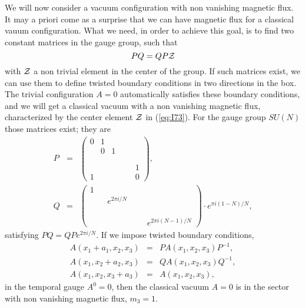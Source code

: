 We will now consider a vacuum configuration with non vanishing
magnetic flux. It may a priori come as a surprise that we can
have magnetic flux for a classical vauum configuration. What we
need, in order to achieve this goal, is to find two constant
matrices in the gauge group, such that \cite{tHcmp}
\begin{equation}
PQ = QP {\cal Z}
\label{eq:I73}
\end{equation}
with ${\cal Z}$ a non trivial element in the center of the group.
If such matrices exist, we can use them to define twisted
boundary conditions in two directions in the box. The trivial
configuration $A=0$ automatically satisfies these boundary
conditions, and we will get a classical vacuum with a non
vanishing magnetic flux, characterized by the center element
${\cal Z}$ in (\ref{eq:I73}). For the gauge group $SU(N)$ those
matrices exist; they are 
\begin{eqnarray}
P & = & \left( \begin{array}{cccccc} 0 & 1 &   &   &   &    \\
			       & 0 & 1 &   &   &    \\
			       &   &   &   &   &    \\
			       &   &   &   &   &    \\
			       &   &   &   &   & 1  \\
			     1 &   &   &   &   & 0
	\end{array} \right), \nonumber \\
Q & = & \left( \begin{array}{cccccc} 1 &  &   &   &   &    \\
			       &   & e^{2\pi i/N} &   &   &    \\
			       &   &   &   &   &    \\
			       &   &   &   &   &    \\
			       &   &   &   &   &   \\
			       &   &   &   &   & e^{2 \pi
i(N-1)/N}
	\end{array} \right) \cdot e^{\pi i(1-N)/N},
\label{eq:I74}
\end{eqnarray}
satisfying $PQ=QPe^{2 \pi i/N}$. If we impose twisted boundary
conditions,
\begin{eqnarray}
A(x_1+a_1,x_2,x_3) & = & P A(x_1,x_2,x_3) P^{-1}, \nonumber \\
A(x_1,x_2+a_2,x_3) & = & Q A(x_1,x_2,x_3) Q^{-1}, \nonumber \\
A(x_1,x_2,x_3+a_3) & = & A(x_1,x_2,x_3),
\label{eq:I75}
\end{eqnarray}
in the temporal gauge $A^0=0$, then the classical vacuum $A=0$
is in the sector with non vanishing magnetic flux, $m_3=1$. 
  
